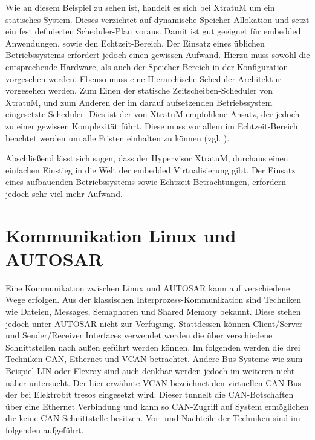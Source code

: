 \documentclass[
  a4paper,					    %
  twoside,
  DIV=calc,     				%
  bibliography=totoc,
  cleardoublepage=empty,
  ngerman,     					%
  final       					%
]{scrbook}
\begin{document}
Wie an diesem Beispiel zu sehen ist, handelt es sich bei XtratuM um ein statisches System. Dieses verzichtet auf dynamische Speicher-Allokation und setzt ein fest definierten Scheduler-Plan voraus. Damit ist gut geeignet für embedded Anwendungen, sowie den Echtzeit-Bereich. Der Einsatz eines üblichen Betriebssystems erfordert jedoch einen gewissen Aufwand. Hierzu muss sowohl die entsprechende Hardware, als auch der Speicher-Bereich in der Konfiguration vorgesehen werden. Ebenso muss eine Hierarchische-Scheduler-Architektur vorgesehen werden. Zum Einen der statische Zeitscheiben-Scheduler von XtratuM, und zum Anderen der im darauf aufsetzenden Betriebssystem eingesetzte Scheduler. Dies ist der von XtratuM empfohlene Ansatz, der jedoch zu einer gewissen Komplexität führt. Diese muss vor allem im Echtzeit-Bereich beachtet werden um alle Fristen einhalten zu können (vgl. \cite{two_lvl_sched}).

Abschließend lässt sich sagen, dass der Hypervisor XtratuM, durchaus einen einfachen Einstieg in die Welt der embedded Virtualisierung gibt. Der Einsatz eines aufbauenden Betriebssystems sowie Echtzeit-Betrachtungen, erfordern jedoch sehr viel mehr Aufwand.




















\section{Kommunikation Linux und AUTOSAR}
\label{sec:Kommunikation_L_A}
Eine Kommunikation zwischen Linux und AUTOSAR kann auf verschiedene Wege erfolgen. Aus der klassischen Interprozess-Kommunikation sind Techniken wie Dateien, Messages, Semaphoren und Shared Memory bekannt. Diese stehen jedoch unter AUTOSAR nicht zur Verfügung. Stattdessen können Client/Server und Sender/Receiver Interfaces verwendet werden die über verschiedene Schnittstellen nach außen geführt werden können. Im folgenden werden die drei Techniken CAN, Ethernet und VCAN betrachtet. Andere Bus-Systeme wie zum Beispiel LIN oder Flexray sind auch denkbar werden jedoch im weiteren nicht näher untersucht. Der hier erwähnte VCAN bezeichnet den virtuellen CAN-Bus der bei Elektrobit tresos eingesetzt wird. Dieser tunnelt die CAN-Botschaften über eine Ethernet Verbindung und kann so CAN-Zugriff auf System ermöglichen die keine CAN-Schnittstelle besitzen. Vor- und Nachteile der Techniken sind im folgenden aufgeführt.
\end{document}
